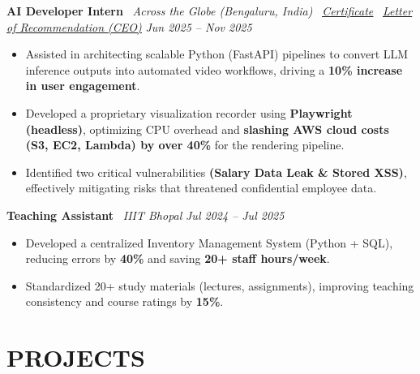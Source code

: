 \documentclass[a4paper,10pt]{article}
\newcommand{\ulhref}[2]{\href{#1}{\uline{#2}}}
\begin{document}
\textbf{AI Developer Intern} \textbar\ \textit{Across the Globe (Bengaluru, India)} \textbar\ \textit{\ulhref{https://drive.google.com/file/d/1uA504CrPV_GRbMPv7xv1I5KOBQYJkNOb/view?usp=sharing}{Certificate}} \textbar\ \textit{\ulhref{https://drive.google.com/file/d/1oBmQhlauoENZSHMzk9S1HFaZVA4W2laZ/view?usp=sharing}{Letter of Recommendation (CEO)}} \hfill \textit{Jun 2025 -- Nov 2025}
\begin{itemize}
    \item Assisted in architecting scalable Python (FastAPI) pipelines to convert LLM inference outputs into automated video workflows, driving a \textbf{10\% increase in user engagement}.
    \item Developed a proprietary visualization recorder using \textbf{Playwright (headless)}, optimizing CPU overhead and \textbf{slashing AWS cloud costs (S3, EC2, Lambda) by over 40\%} for the rendering pipeline.
    \item Identified two critical vulnerabilities \textbf{(Salary Data Leak \& Stored XSS)}, effectively mitigating risks that threatened confidential employee data. 
\end{itemize}



\textbf{Teaching Assistant} \textbar\ \textit{IIIT Bhopal} \hfill \textit{Jul 2024 -- Jul 2025}
\begin{itemize}
    \item Developed a centralized Inventory Management System (Python + SQL), reducing errors by \textbf{40\%} and saving \textbf{20+ staff hours/week}.
    \item Standardized 20+ study materials (lectures, assignments), improving teaching consistency and course ratings by \textbf{15\%}.
\end{itemize}

\section*{PROJECTS}
\end{document}
